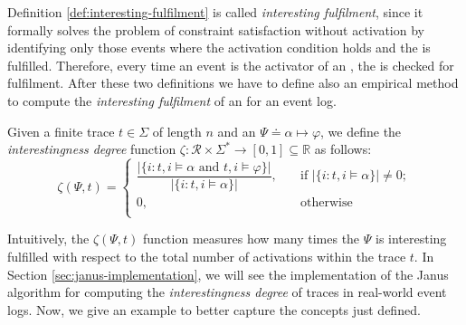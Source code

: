 Definition \ref{def:interesting-fulfilment} is called \textit{interesting fulfilment}, since it formally solves the problem of constraint satisfaction without activation by identifying only those events where the activation condition holds and the \rcon\xspace is fulfilled. Therefore, every time an event is the activator of an \rcon, the \rcon\xspace is checked for fulfilment.
After these two definitions we have to define also an empirical method to compute the \textit{interesting fulfilment} of an \rcon\xspace for an event log.

\begin{definition}\citep{cecconi2018interestingness}\label{def:interestingness-degree}
Given a finite trace $t \in \Sigma$ of length $n$ and an \rcon\xspace $\Psi \doteq \alpha  \mapsto \varphi$, we define the \emph{interestingness degree} function $\zeta: \mathcal{R} \times \Sigma^* \rightarrow [0,1] \subseteq \mathbb{R}$ as follows:
\[   
\zeta(\Psi,t) = 
     \begin{cases}
       \dfrac{\lvert \{ i: t,i \models \alpha \text{ and } t,i \models \varphi\} \rvert}{\lvert \{ i: t,i \models \alpha\} \rvert}, &\quad\text{if } \lvert \{ i: t,i \models \alpha\} \rvert \neq 0 ;\\
       0, &\quad\text{otherwise} \\
     \end{cases}
\]
\end{definition}
Intuitively, the $\zeta(\Psi, t)$ function measures how many times the \rcon\xspace $\Psi$ is interesting fulfilled with respect to the total number of activations within the trace $t$. In Section \ref{sec:janus-implementation}, we will see the implementation of the Janus algorithm for computing the \emph{interestingness degree} of traces in real-world event logs.
Now, we give an example to better capture the concepts just defined.

